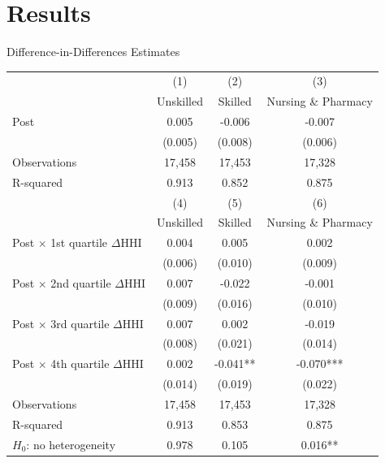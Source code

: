 \documentclass{beamer}
\begin{document}
\section{Results}


\begin{frame}{Difference-in-Differences Estimates}
\scriptsize
\setlength{\tabcolsep}{4pt}
\renewcommand{\arraystretch}{0.9}
  \begin{centering}

    \begin{tabular}{lccc}
    \toprule
    & (1) & (2) & (3) \\
    & Unskilled & Skilled & Nursing \& Pharmacy \\
    \midrule
    Post & 0.005 & -0.006 & -0.007 \\
        & (0.005) & (0.008) & (0.006) \\
    \addlinespace
    Observations & 17,458 & 17,453 & 17,328 \\
    R-squared    & 0.913  & 0.852  & 0.875  \\
    \midrule
    & (4) & (5) & (6) \\
    & Unskilled & Skilled & Nursing \& Pharmacy \\
    \midrule
    Post $\times$ 1st quartile $\Delta$HHI & 0.004 & 0.005 & 0.002 \\
                                          & (0.006) & (0.010) & (0.009) \\
    Post $\times$ 2nd quartile $\Delta$HHI & 0.007 & -0.022 & -0.001 \\
                                          & (0.009) & (0.016) & (0.010) \\
    Post $\times$ 3rd quartile $\Delta$HHI & 0.007 & 0.002 & -0.019 \\
                                          & (0.008) & (0.021) & (0.014) \\
    Post $\times$ 4th quartile $\Delta$HHI & 0.002 & -0.041** & -0.070*** \\
                                          & (0.014) & (0.019) & (0.022) \\
    \addlinespace
    Observations & 17,458 & 17,453 & 17,328 \\
    R-squared    & 0.913  & 0.853  & 0.875  \\
    \midrule
    $H_{0}$: no heterogeneity & 0.978 & 0.105 & 0.016** \\
    \bottomrule
    \end{tabular}

  \end{centering}
\end{frame}
\end{document}
